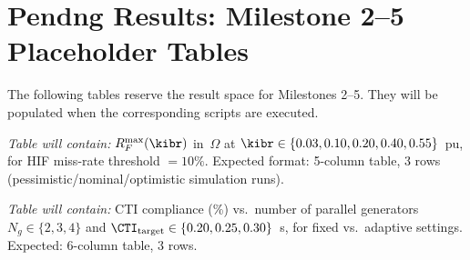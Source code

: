 \section{Pendng Results: Milestone 2--5 Placeholder Tables}
\label{app:syncoc_pending}

The following tables reserve the result space for Milestones 2--5.
They will be populated when the corresponding scripts are executed.

\begin{tcolorbox}[colback=orange!5,colframe=orange!60!black,
  fonttitle=\bfseries\small,
  title={Table App-D.4: HIF Sensitivity Boundary (Milestone 2 --- Pending)},
  breakable]
\small
\textit{Table will contain:}
$R_F^\mathrm{max}(\kibr)$ in~$\Omega$ at $\kibr \in \{0.03, 0.10, 0.20, 0.40, 0.55\}$~pu,
for HIF miss-rate threshold $= 10\%$.
Expected format: 5-column table, 3 rows (pessimistic/nominal/optimistic simulation runs).
\end{tcolorbox}

\begin{tcolorbox}[colback=orange!5,colframe=orange!60!black,
  fonttitle=\bfseries\small,
  title={Table App-D.5: Multi-Generator CTI Compliance (Milestone 5 --- Pending)},
  breakable]
\small
\textit{Table will contain:}
CTI compliance (\%) vs.\ number of parallel generators $N_g \in \{2, 3, 4\}$
and $\CTI_\mathrm{target} \in \{0.20, 0.25, 0.30\}$~s,
for fixed vs.\ adaptive settings.
Expected: 6-column table, 3 rows.
\end{tcolorbox}
